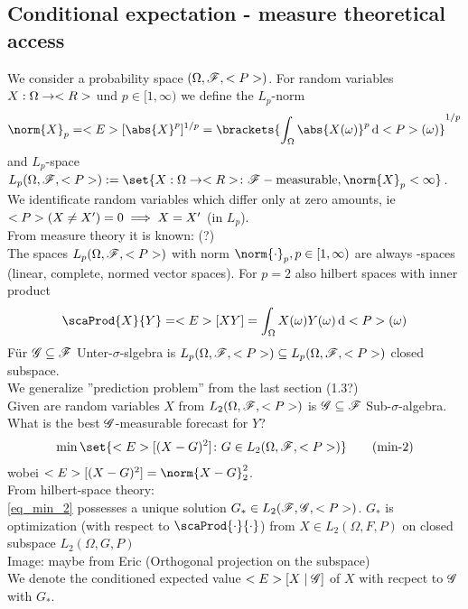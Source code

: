 \subsection{Conditional expectation - measure theoretical access}
We consider a probability space $(\O, \F,\P)$. For random variables $X: \O \to \R$ und $p \in [1,\infty)$ we define the $L_p$-norm
\begin{align*}
	\norm{X}_p = \E[\abs{X}^p]^{1/p} = \brackets{\int_{\O} \abs{X(\omega)}^p \d \P(\omega)}^{1/p}
\end{align*}
and $L_p$-space $L_p(\O,\F,\P):= \set{X: \O \to \R\colon \F-\text{measurable}, \norm{X}_p < \infty}$. We identificate random variables which differ only at zero amounts, ie $\P(X \neq X') = 0 \implies X = X'$ (in $L_p$).\\
From measure theory it is known: (?)\\
The spaces $L_p(\O,\F,\P)$ with norm $\norm{\cdot}_p, p \in [1,\infty)$ are always -spaces (linear, complete, normed vector spaces). For $p = 2$ also hilbert spaces with inner product
\begin{align*}
	\scaProd{X}{Y} = \E[XY] = \int_{\O} X(\omega)Y(\omega)\d \P(\omega)
\end{align*}
Für $\G \subseteq \F$ Unter-$\sigma$-slgebra is $L_p(\O,\F,\P) \subseteq L_p(\O,\F,\P)$ closed subspace.\\
We generalize ''prediction problem'' from the last section (1.3?)\\
Given are random variables $X$ from $L_2(\O,\F,\P)$ is $\G \subseteq \F$ Sub-$\sigma$-algebra.\\
What is the best $\G$-measurable forecast for $Y$?
\begin{align*}
	\min\set{\E[(X-G)^2] \colon G \in L_2(\O,\F,\P)} \tag{min-2}\label{eq_min_2}
\end{align*}
wobei $\E[(X-G)^2] = \norm{X-G}^2_2$.\\
From hilbert-space theory:\\
\eqref{eq_min_2} possesses a unique solution $G_{\ast} \in L_2(\F,\G,\P)$. $G_{\ast}$ is optimization (with respect to $\scaProd{\cdot}{\cdot}$) from $X \in L_2(\Omega,F,P)$ on closed subspace $L_2(\Omega,G,P)$\\
Image: maybe from Eric (Orthogonal projection on the subspace)\\
We denote the conditioned expected value $\E[X\mid \G]$ of $X$ with recpect to $\G$ with $G_{\ast}$.
